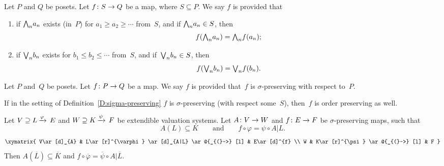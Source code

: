 \documentclass[main.tex]{subfiles}
\begin{document}
%
%
\begin{dfn}
\label{D:sigma-preserving}
Let $P$ and $Q$ be posets.
Let $f\colon S\rightarrow Q$ be a map, where $S\subseteq P$.
We say $f$ is 
provided that
\begin{enumerate}
\item
if 
$\textstyle{\bigwedge}_n{a_n}$ exists
(in~$P$)
for
$a_1 \geq a_2 \geq \dotsb$
from~$S$,
and if $\textstyle{\bigwedge}_n a_n\in S$,
then 
\begin{equation*}
f(\textstyle{\bigwedge}_n a_n) = \textstyle{\bigwedge}_n f(a_n);
\end{equation*}

\item
if 
$\textstyle{\bigvee}_n{b_n}$ exists
for
$b_1 \leq b_2 \leq \dotsb$
from~$S$,
and if~$\textstyle{\bigvee}_n b_n\in S$,
then 
\begin{equation*}
f(\textstyle{\bigvee}_n b_n) = \textstyle{\bigvee}_n f(b_n).
\end{equation*}
\end{enumerate}
Let $P$ and~$Q$ be posets. Let $f\colon P \rightarrow Q$ be a map.
We say $f$ is 
provided that~$f$ is $\sigma$-preserving with respect to~$P$.
\end{dfn}
\begin{rem}
If in the setting of Definition~\ref{D:sigma-preserving}
$f$ is $\sigma$-preserving
(with respect some~$S$),
then~$f$ is order preserving as well.
\end{rem}
%
%
\begin{thm}
\label{T:ext1}
Let $V \supseteq L\,\smash{\xrightarrow{\varphi}\,E}$ and
 $W \supseteq K\,\smash{\xrightarrow{\psi}\,F}$ be extendible valuation systems.
Let
$A\colon V\rightarrow W$
and 
$f\colon E\rightarrow F$ be $\sigma$-preserving maps,
such that 
\begin{equation*}
A(L)\subseteq K
\qquad\text{and}\qquad
f \circ \varphi = \psi \circ A|L.
\end{equation*}
\begin{equation*}
\xymatrix{
V\ar[d]_{A} & 
  L\ar[r]^{\varphi} \ar[d]_{A|L} \ar @{_{(}->} [l] & 
  E\ar[d]^{f} \\
W &
  K\ar[r]^{\psi} \ar @{_{(}->} [l] & 
  F
}\end{equation*}
Then $A(\overline{L})\subseteq \overline{K}$
and $f \circ \overline\varphi = \overline\psi\circ A|\overline L$.
\end{thm}
\end{document}
